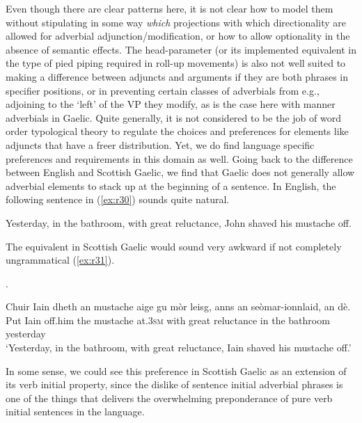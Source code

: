 \documentclass[output=paper,colorlinks,citecolor=brown]{langscibook}
\begin{document}
Even though there are clear patterns here, it is not clear how to model them without stipulating in some way  \textit{which} projections with which directionality are allowed for adverbial adjunction/modification, or how to allow optionality in the absence of semantic effects.  The head-parameter (or its implemented equivalent in the type of pied piping required in roll-up movements) is also not well suited to making a difference between adjuncts and arguments if they are both phrases in specifier positions, or in preventing certain classes of adverbials from e.g., adjoining to the `left' of the VP they modify, as is the case here with manner adverbials in  Gaelic. 
Quite generally, it is not considered to be the job of word order typological theory to regulate the choices and preferences for elements like adjuncts that have a freer distribution. Yet, we do find language specific preferences and requirements in this domain as well. Going back to the difference between English and Scottish Gaelic, we find that Gaelic does not generally allow adverbial elements to stack up at the beginning of a sentence. In English, the following sentence in (\ref{ex:r30}) sounds quite natural.

\ea\label{ex:r30}
Yesterday, in the bathroom, with great reluctance, John shaved his mustache off.
\z

\noindent The equivalent in Scottish Gaelic would sound very awkward if not completely ungrammatical (\ref{ex:r31}).

\z

.

\ea\label{ex:r32}
\gll Chuir Iain dheth an mustache aige gu m\`{or} leisg, anns an se\`{o}mar-ionnlaid, {an d\`{e}. } \\
Put Iain off.him the mustache at.\textsc{3sm}  with great reluctance in the bathroom {yesterday} \\
\glt `Yesterday, in the bathroom, with great reluctance, Iain shaved his mustache off.'
\z

In some sense, we could see this preference in Scottish Gaelic as an extension of its verb initial property, since the dislike of sentence initial adverbial phrases is one of the things that delivers the overwhelming preponderance of pure verb initial sentences in the language. 
\end{document}
